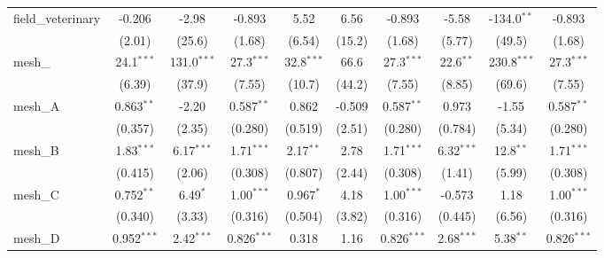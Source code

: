 \begin{tabular}{lccccccccc}
   field\_veterinary                                           & -0.206         & -2.98          & -0.893         & 5.52           & 6.56          & -0.893         & -5.58          & -134.0$^{**}$  & -0.893\\   
                                                               & (2.01)         & (25.6)         & (1.68)         & (6.54)         & (15.2)        & (1.68)         & (5.77)         & (49.5)         & (1.68)\\   
   mesh\_                                                      & 24.1$^{***}$   & 131.0$^{***}$  & 27.3$^{***}$   & 32.8$^{***}$   & 66.6          & 27.3$^{***}$   & 22.6$^{**}$    & 230.8$^{***}$  & 27.3$^{***}$\\   
                                                               & (6.39)         & (37.9)         & (7.55)         & (10.7)         & (44.2)        & (7.55)         & (8.85)         & (69.6)         & (7.55)\\   
   mesh\_A                                                     & 0.863$^{**}$   & -2.20          & 0.587$^{**}$   & 0.862          & -0.509        & 0.587$^{**}$   & 0.973          & -1.55          & 0.587$^{**}$\\   
                                                               & (0.357)        & (2.35)         & (0.280)        & (0.519)        & (2.51)        & (0.280)        & (0.784)        & (5.34)         & (0.280)\\   
   mesh\_B                                                     & 1.83$^{***}$   & 6.17$^{***}$   & 1.71$^{***}$   & 2.17$^{**}$    & 2.78          & 1.71$^{***}$   & 6.32$^{***}$   & 12.8$^{**}$    & 1.71$^{***}$\\   
                                                               & (0.415)        & (2.06)         & (0.308)        & (0.807)        & (2.44)        & (0.308)        & (1.41)         & (5.99)         & (0.308)\\   
   mesh\_C                                                     & 0.752$^{**}$   & 6.49$^{*}$     & 1.00$^{***}$   & 0.967$^{*}$    & 4.18          & 1.00$^{***}$   & -0.573         & 1.18           & 1.00$^{***}$\\   
                                                               & (0.340)        & (3.33)         & (0.316)        & (0.504)        & (3.82)        & (0.316)        & (0.445)        & (6.56)         & (0.316)\\   
   mesh\_D                                                     & 0.952$^{***}$  & 2.42$^{***}$   & 0.826$^{***}$  & 0.318          & 1.16          & 0.826$^{***}$  & 2.68$^{***}$   & 5.38$^{**}$    & 0.826$^{***}$\\   

\end{tabular}
